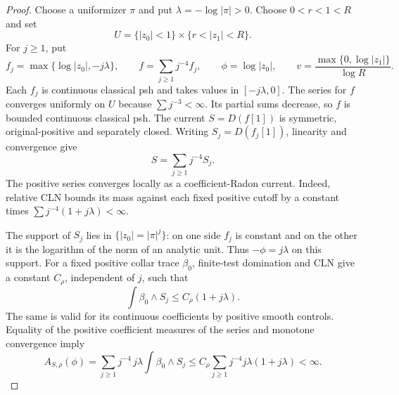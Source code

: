 \documentclass[11pt,a4paper]{article}
\numberwithin{equation}{section}
\theoremstyle{definition}
\theoremstyle{remark}
\begin{document}
\begin{proof}
Choose a uniformizer $\pi$ and put $\lambda=-\log|\pi|>0$.
Choose $0<r<1<R$ and set
\[
 U=\{|z_0|<1\}\times\{r<|z_1|<R\}.
\]
For $j\geq1$, put
\[
 f_j=\max\{\log|z_0|,-j\lambda\},\qquad
 f=\sum_{j\geq1}j^{-4}f_j,\qquad
 \phi=\log|z_0|,\qquad
 v=\frac{\max\{0,\log|z_1|\}}{\log R}.
\]
Each $f_j$ is continuous classical psh and takes values in
$[-j\lambda,0]$. The series for $f$ converges uniformly on $U$
because $\sum j^{-3}<\infty$. Its partial sums decrease, so $f$
is bounded continuous classical psh. The current
$S=D(f[1])$ is symmetric, original-positive and separately closed.
Writing $S_j=D(f_j[1])$, linearity and convergence give
\[
 S=\sum_{j\geq1}j^{-4}S_j.
\]
The positive series converges locally as a coefficient-Radon
current. Indeed, relative CLN bounds its mass against each fixed
positive cutoff by a constant times
$\sum j^{-4}(1+j\lambda)<\infty$.

The support of $S_j$ lies in $\{|z_0|=|\pi|^j\}$: on one
side $f_j$ is constant and on the other it is the logarithm of
the norm of an analytic unit. Thus $-\phi=j\lambda$ on this
support. For a fixed positive collar trace $\beta_0$, finite-test
domination and CLN give a constant $C_\rho$, independent of $j$,
such that
\[
 \int\beta_0\wedge S_j\leq C_\rho(1+j\lambda).
\]
The same is valid for its continuous coefficients by positive
smooth controls. Equality of the positive coefficient measures of
the series and monotone convergence imply
\[
 A_{S,\rho}(\phi)
  =\sum_{j\geq1}j^{-4}\,j\lambda
                       \int\beta_0\wedge S_j
  \leq C_\rho\sum_{j\geq1}j^{-4}j\lambda(1+j\lambda)<\infty.
\]


\end{proof}
\end{document}
